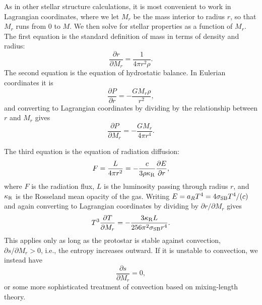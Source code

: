 As in other stellar structure calculations, it is most convenient to work in Lagrangian coordinates, where we let $M_r$ be the mass interior to radius $r$, so that $M_r$ runs from 0 to $M$. We then solve for stellar properties as a function of $M_r$. The first equation is the standard definition of mass in terms of density and radius:
\begin{equation}
\label{mass}
\frac{\partial r}{\partial M_r} = \frac{1}{4\pi r^2 \rho}.
\end{equation}
The second equation is the equation of hydrostatic balance. In Eulerian coordinates it is
\begin{equation}
\label{eq:hydrobalance}
\frac{\partial P}{\partial r} = -\frac{G M_r \rho}{r^2},
\end{equation}
and converting to Lagrangian coordinates by dividing by the relationship between $r$ and $M_r$ gives
\begin{equation}
\frac{\partial P}{\partial M_r} = -\frac{G M_r}{4\pi r^4}.
\end{equation}

The third equation is the equation of radiation diffusion:
\begin{equation}
F = \frac{L}{4\pi r^2} = -\frac{c}{3\rho\kappa_{\rm R}} \frac{\partial E}{\partial r},
\end{equation}
where $F$ is the radiation flux, $L$ is the luminosity passing through radius $r$, and $\kappa_{\rm R}$ is the Rosseland mean opacity of the gas. Writing $E=a_R T^4 = 4 \sigma_{\rm SB} T^4/(c)$ and again converting to Lagrangian coordinates by dividing by $\partial r/\partial M_r$ gives
\begin{equation}
T^3 \frac{\partial T}{\partial M_r} = - \frac{3\kappa_{\rm R} L}{256 \pi^2 \sigma_{\rm SB} r^4}.
\end{equation}
This applies only as long as the protostar is stable against convection, $\partial s/\partial M_r > 0$, i.e., the entropy increases outward. If it is unstable to convection, we instead have
\begin{equation}
\frac{\partial s}{\partial M_r} = 0,
\end{equation}
or some more sophisticated treatment of convection based on mixing-length theory.

